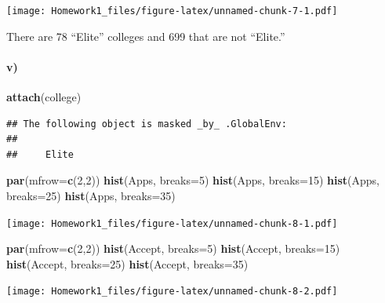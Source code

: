 \documentclass[]{article}
\newenvironment{Shaded}{\begin{snugshade}}{\end{snugshade}}
\newcommand{\KeywordTok}[1]{\textcolor[rgb]{0.13,0.29,0.53}{\textbf{#1}}}
\newcommand{\DataTypeTok}[1]{\textcolor[rgb]{0.13,0.29,0.53}{#1}}
\newcommand{\DecValTok}[1]{\textcolor[rgb]{0.00,0.00,0.81}{#1}}
\newcommand{\NormalTok}[1]{#1}
\let\oldparagraph\paragraph
\renewcommand{\paragraph}[1]{\oldparagraph{#1}\mbox{}}
\begin{document}
\texttt{[image: Homework1\_files/figure-latex/unnamed-chunk-7-1.pdf]}

There are 78 ``Elite'' colleges and 699 that are not ``Elite.''

\paragraph{v)}\label{v}

\begin{Shaded}
\begin{Highlighting}[]
\KeywordTok{attach}\NormalTok{(college)}
\end{Highlighting}
\end{Shaded}

\begin{verbatim}
## The following object is masked _by_ .GlobalEnv:
## 
##     Elite
\end{verbatim}

\begin{Shaded}
\begin{Highlighting}[]
\KeywordTok{par}\NormalTok{(}\DataTypeTok{mfrow=}\KeywordTok{c}\NormalTok{(}\DecValTok{2}\NormalTok{,}\DecValTok{2}\NormalTok{))}
\KeywordTok{hist}\NormalTok{(Apps, }\DataTypeTok{breaks=}\DecValTok{5}\NormalTok{)}
\KeywordTok{hist}\NormalTok{(Apps, }\DataTypeTok{breaks=}\DecValTok{15}\NormalTok{)}
\KeywordTok{hist}\NormalTok{(Apps, }\DataTypeTok{breaks=}\DecValTok{25}\NormalTok{)}
\KeywordTok{hist}\NormalTok{(Apps, }\DataTypeTok{breaks=}\DecValTok{35}\NormalTok{)}
\end{Highlighting}
\end{Shaded}

\texttt{[image: Homework1\_files/figure-latex/unnamed-chunk-8-1.pdf]}

\begin{Shaded}
\begin{Highlighting}[]
\KeywordTok{par}\NormalTok{(}\DataTypeTok{mfrow=}\KeywordTok{c}\NormalTok{(}\DecValTok{2}\NormalTok{,}\DecValTok{2}\NormalTok{))}
\KeywordTok{hist}\NormalTok{(Accept, }\DataTypeTok{breaks=}\DecValTok{5}\NormalTok{)}
\KeywordTok{hist}\NormalTok{(Accept, }\DataTypeTok{breaks=}\DecValTok{15}\NormalTok{)}
\KeywordTok{hist}\NormalTok{(Accept, }\DataTypeTok{breaks=}\DecValTok{25}\NormalTok{)}
\KeywordTok{hist}\NormalTok{(Accept, }\DataTypeTok{breaks=}\DecValTok{35}\NormalTok{)}
\end{Highlighting}
\end{Shaded}

\texttt{[image: Homework1\_files/figure-latex/unnamed-chunk-8-2.pdf]}
\end{document}
